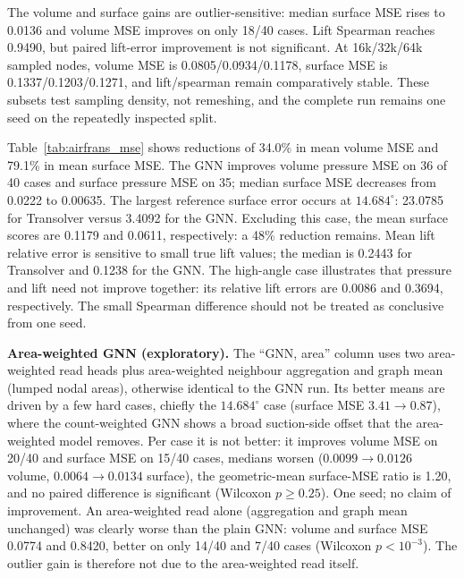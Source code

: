\documentclass[journal]{IEEEtran}
\begin{document}
The volume and surface gains are outlier-sensitive: median surface MSE rises to
0.0136 and volume MSE improves on only 18/40 cases. Lift Spearman reaches
0.9490, but paired lift-error improvement is not significant. At 16k/32k/64k
sampled nodes, volume MSE is 0.0805/0.0934/0.1178, surface MSE is
0.1337/0.1203/0.1271, and lift/spearman remain comparatively stable. These
subsets test sampling density, not remeshing, and the complete run remains one
seed on the repeatedly inspected split.

Table~\ref{tab:airfrans_mse} shows reductions of 34.0\% in mean volume MSE
and 79.1\% in mean surface MSE. The GNN improves volume pressure MSE on 36 of
40 cases and surface pressure MSE on 35; median surface MSE decreases from
0.0222 to 0.00635. The largest reference surface error occurs at
$14.684^\circ$: 23.0785 for Transolver versus 3.4092 for the GNN. Excluding
this case, the mean surface scores are 0.1179 and 0.0611, respectively: a 48\%
reduction remains. Mean lift relative error is sensitive to small true lift
values; the median is 0.2443 for Transolver and 0.1238 for the GNN. The
high-angle case illustrates that pressure and lift need not improve together:
its relative lift errors are 0.0086 and 0.3694, respectively. The small
Spearman difference should not be treated as conclusive from one seed.

\textbf{Area-weighted GNN (exploratory).} The ``GNN, area'' column uses two
area-weighted read heads plus area-weighted neighbour aggregation and graph mean
(lumped nodal areas), otherwise identical to the GNN run. Its better means are
driven by a few hard cases, chiefly the $14.684^\circ$ case (surface MSE
$3.41\to0.87$), where the count-weighted GNN shows a broad suction-side offset
that the area-weighted model removes. Per case it is not better: it improves
volume MSE on 20/40 and surface MSE on 15/40 cases, medians worsen
($0.0099\to0.0126$ volume, $0.0064\to0.0134$ surface), the geometric-mean
surface-MSE ratio is 1.20, and no paired difference is significant (Wilcoxon
$p\ge0.25$). One seed; no claim of improvement. An area-weighted read alone
(aggregation and graph mean unchanged) was clearly worse than the plain GNN:
volume and surface MSE 0.0774 and 0.8420, better on only 14/40 and 7/40 cases
(Wilcoxon $p<10^{-3}$). The outlier gain is therefore not due to the
area-weighted read itself.
\end{document}
